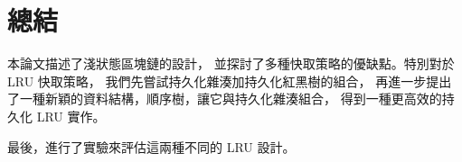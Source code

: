 \chapter{總結}

本論文描述了淺狀態區塊鏈的設計，
並探討了多種快取策略的優缺點。特別對於 LRU 快取策略，
我們先嘗試持久化雜湊加持久化紅黑樹的組合，
再進一步提出了一種新穎的資料結構，順序樹，讓它與持久化雜湊組合，
得到一種更高效的持久化 LRU 實作。

最後，進行了實驗來評估這兩種不同的 LRU 設計。